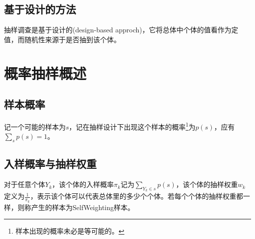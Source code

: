 \subsection{基于设计的方法}
抽样调查是基于设计的(design-based approch)，它将总体中个体的值看作为定值，而随机性来源于是否抽到该个体。

\section{概率抽样概述}
\subsection{样本概率}
记一个可能的样本为$s$，记在抽样设计下出现这个样本的概率\footnote{样本出现的概率未必是等可能的。}为$p(s)$，应有$\sum\limits_{s}p(s)=1$。
\subsection{入样概率与抽样权重}
对于任意个体$Y_k$，该个体的入样概率$\pi_k$记为$\sum\limits_{Y_k\in s}p(s)$，该个体的抽样权重$w_k$定义为$\frac{1}{\pi_k}$，表示该个体可以代表总体里的多少个个体。若每个个体的抽样权重都一样，则称产生的样本为\gls{SelfWeighting}样本。

